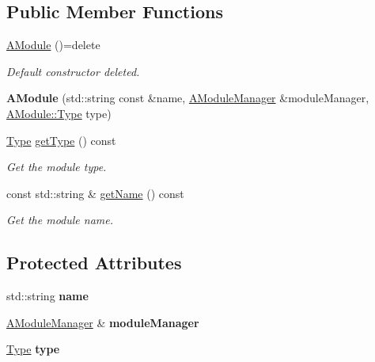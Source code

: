 \subsection*{Public Member Functions}
\begin{DoxyCompactItemize}
\item 
\mbox{\hyperlink{classxzia_1_1AModule_a1f9a69c543cb4d04be0a6d246ad0287d}{A\+Module}} ()=delete
\begin{DoxyCompactList}\small\item\em Default constructor deleted. \end{DoxyCompactList}\item 
\mbox{\label{classxzia_1_1AModule_aa97df74e40876c19008735c741c84078}} 
{\bfseries A\+Module} (std\+::string const \&name, \mbox{\hyperlink{classxzia_1_1AModuleManager}{A\+Module\+Manager}} \&module\+Manager, \mbox{\hyperlink{classxzia_1_1AModule_a73967be2c863fcfdff0eef4a701df1e0}{A\+Module\+::\+Type}} type)
\item 
\mbox{\hyperlink{classxzia_1_1AModule_a73967be2c863fcfdff0eef4a701df1e0}{Type}} \mbox{\hyperlink{classxzia_1_1AModule_ae07019977cab27aebdc34c98de35a3c8}{get\+Type}} () const
\begin{DoxyCompactList}\small\item\em Get the module type. \end{DoxyCompactList}\item 
const std\+::string \& \mbox{\hyperlink{classxzia_1_1AModule_ad948424683268c572aba3a410288ca22}{get\+Name}} () const
\begin{DoxyCompactList}\small\item\em Get the module name. \end{DoxyCompactList}\end{DoxyCompactItemize}
\subsection*{Protected Attributes}
\begin{DoxyCompactItemize}
\item 
\mbox{\label{classxzia_1_1AModule_a6ee180b2e689fee0742b73af1e394340}} 
std\+::string {\bfseries name}
\item 
\mbox{\label{classxzia_1_1AModule_af621d54793ce30445f164c5787acd541}} 
\mbox{\hyperlink{classxzia_1_1AModuleManager}{A\+Module\+Manager}} \& {\bfseries module\+Manager}
\item 
\mbox{\label{classxzia_1_1AModule_a331fe5174181857d396fe02e7e945b30}} 
\mbox{\hyperlink{classxzia_1_1AModule_a73967be2c863fcfdff0eef4a701df1e0}{Type}} {\bfseries type}
\end{DoxyCompactItemize}
